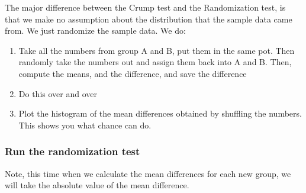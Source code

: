 \documentclass[]{book}
\providecommand{\tightlist}{%
  \setlength{\itemsep}{0pt}\setlength{\parskip}{0pt}}
\theoremstyle{definition}
\theoremstyle{definition}
\theoremstyle{definition}
\theoremstyle{remark}
\begin{document}
The major difference between the Crump test and the Randomization test,
is that we make no assumption about the distribution that the sample
data came from. We just randomize the sample data. We do:

\begin{enumerate}
\def\labelenumi{\arabic{enumi}.}
\tightlist
\item
  Take all the numbers from group A and B, put them in the same pot.
  Then randomly take the numbers out and assign them back into A and B.
  Then, compute the means, and the difference, and save the difference
\item
  Do this over and over
\item
  Plot the histogram of the mean differences obtained by shuffling the
  numbers. This shows you what chance can do.
\end{enumerate}

\subsubsection{Run the randomization
test}\label{run-the-randomization-test}

Note, this time when we calculate the mean differences for each new
group, we will take the absolute value of the mean difference.
\end{document}
